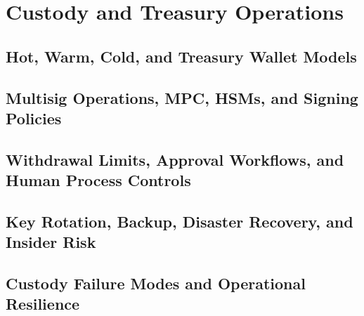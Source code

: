 \chapter{Custody and Treasury Operations}

\section{Hot, Warm, Cold, and Treasury Wallet Models}

\section{Multisig Operations, MPC, HSMs, and Signing Policies}

\section{Withdrawal Limits, Approval Workflows, and Human Process Controls}

\section{Key Rotation, Backup, Disaster Recovery, and Insider Risk}

\section{Custody Failure Modes and Operational Resilience}
